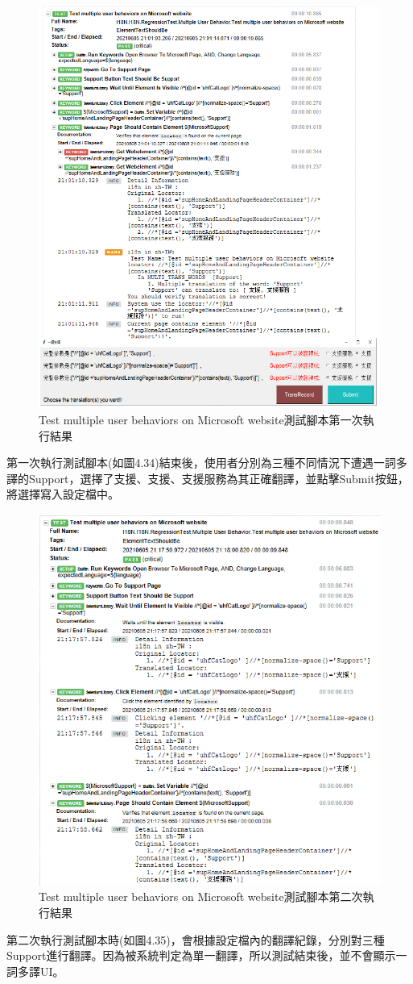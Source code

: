 \begin{figure}[H]
\includegraphics[width= \textwidth]{../論文截圖/4-4-2 test multiple user behaviors測試腳本1st run.png}
\caption{Test multiple user behaviors on Microsoft website測試腳本第一次執行結果}
\end{figure}

第一次執行測試腳本(如圖4.34)結束後，使用者分別為三種不同情況下遭遇一詞多譯的Support，選擇了支援、支援、支援服務為其正確翻譯，並點擊Submit按鈕，將選擇寫入設定檔中。

\begin{figure}[H]
\centering
\includegraphics[width= .9\textwidth]{../論文截圖/4-4-3 test multiple user behaviors測試腳本2nd run.png}
\caption{Test multiple user behaviors on Microsoft website測試腳本第二次執行結果}
\end{figure}

第二次執行測試腳本時(如圖4.35)，會根據設定檔內的翻譯紀錄，分別對三種Support進行翻譯。因為被系統判定為單一翻譯，所以測試結束後，並不會顯示一詞多譯UI。
